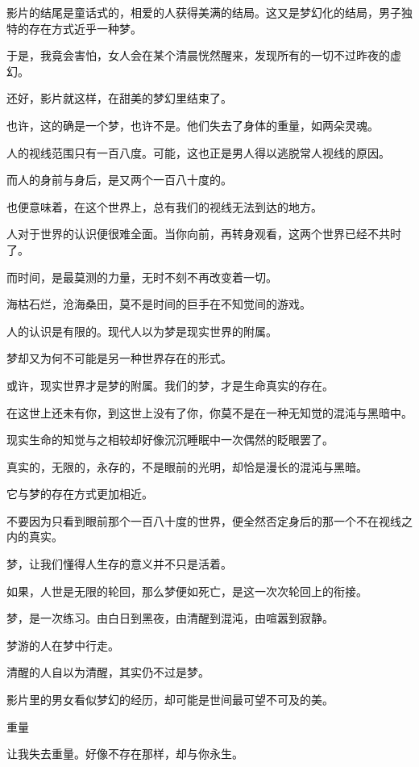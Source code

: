 \documentclass[12pt,a4paper]{article}
\newcommand{\subpart}[1]{
	\begingroup \par
	\vspace{1ex} \centering #1
	\par \endgroup
}
\begin{document}
		影片的结尾是童话式的，相爱的人获得美满的结局。这又是梦幻化的结局，男子独特的存在方式近乎一种梦。\par
		于是，我竟会害怕，女人会在某个清晨恍然醒来，发现所有的一切不过昨夜的虚幻。\par
		还好，影片就这样，在甜美的梦幻里结束了。\par
		也许，这的确是一个梦，也许不是。他们失去了身体的重量，如两朵灵魂。\par
		人的视线范围只有一百八度。可能，这也正是男人得以逃脱常人视线的原因。\par
		而人的身前与身后，是又两个一百八十度的。\par
		也便意味着，在这个世界上，总有我们的视线无法到达的地方。\par
		人对于世界的认识便很难全面。当你向前，再转身观看，这两个世界已经不共时了。\par
		而时间，是最莫测的力量，无时不刻不再改变着一切。\par
		海枯石烂，沧海桑田，莫不是时间的巨手在不知觉间的游戏。\par
		人的认识是有限的。现代人以为梦是现实世界的附属。\par
		梦却又为何不可能是另一种世界存在的形式。\par
		或许，现实世界才是梦的附属。我们的梦，才是生命真实的存在。\par
		在这世上还未有你，到这世上没有了你，你莫不是在一种无知觉的混沌与黑暗中。\par
		现实生命的知觉与之相较却好像沉沉睡眠中一次偶然的眨眼罢了。\par
		真实的，无限的，永存的，不是眼前的光明，却恰是漫长的混沌与黑暗。\par
		它与梦的存在方式更加相近。\par
		不要因为只看到眼前那个一百八十度的世界，便全然否定身后的那一个不在视线之内的真实。\par
		梦，让我们懂得人生存的意义并不只是活着。\par
		如果，人世是无限的轮回，那么梦便如死亡，是这一次次轮回上的衔接。\par
		梦，是一次练习。由白日到黑夜，由清醒到混沌，由喧嚣到寂静。\par
		梦游的人在梦中行走。\par
		清醒的人自以为清醒，其实仍不过是梦。\par
		影片里的男女看似梦幻的经历，却可能是世间最可望不可及的美。


		\subpart{重量}

		让我失去重量。好像不存在那样，却与你永生。
\end{document}
